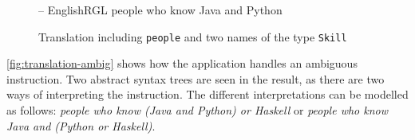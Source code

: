 \begin{figure}[H]
\begin{terminal}
-- EnglishRGL
people who know Java and Python
\end{terminal}
\begin{json-small}
\end{json-small}
\caption{Translation including \texttt{people} and two names of the type \texttt{Skill}\label{fig:translation-java-python}}
\end{figure}

\autoref{fig:translation-ambig} shows how the application handles an ambiguous instruction. Two abstract syntax trees are seen in the result, as there are two ways of interpreting the instruction. The different interpretations can be modelled as follows: \emph{people who know (Java and Python) or Haskell} or \emph{people who know Java and (Python or Haskell)}.

